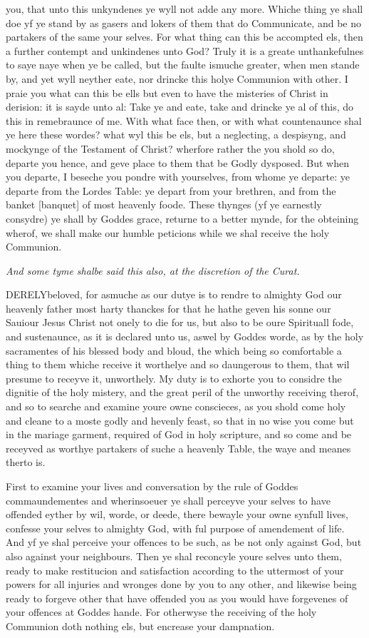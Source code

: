 you, that unto this unkyndenes ye wyll not adde any more. Whiche thing
ye shall doe yf ye stand by as gasers and lokers of them that do Communicate,
and be no partakers of the same your selves. For what thing can this be
accompted els, then a further contempt and unkindenes unto God? Truly
it is a greate unthankefulnes to saye naye when ye be called, but the
faulte ismuche greater, when men stande by, and yet wyll neyther eate,
nor drincke this holye Communion with other. I praie you what can this
be ells but even to have the misteries of Christ in derision: it is sayde
unto al: Take ye and eate, take and drincke ye al of this, do this in
remebraunce of me. With what face then, or with what countenaunce shal
ye here these wordes? what wyl this be els, but a neglecting, a despisyng,
and mockynge of the Testament of Christ? wherfore rather the you shold
so do, departe you hence, and geve place to them that be Godly dysposed.
But when you departe, I beseche you pondre with yourselves, from whome
ye departe: ye departe from the Lordes Table: ye depart from your brethren,
and from the banket [banquet]
of most heavenly foode. These thynges (yf ye earnestly consydre) ye shall
by Goddes grace, returne to a better mynde, for the obteining wherof,
we shall make our humble peticions while we shal receive the holy Communion.

\emph{And
some tyme shalbe said this also, at the discretion of the Curat.}

DERELY\textbf{}beloved, for asmuche as our dutye is to rendre to almighty God our
heavenly father most harty thanckes for that he hathe geven his sonne
our Sauiour Jesus Christ not onely to die for us, but also to be oure
Spirituall fode, and sustenaunce, as it is declared unto us, aswel by
Goddes worde, as by the holy sacramentes of his blessed body and bloud,
the which being so comfortable a thing to them whiche receive it worthelye
and so daungerous to them, that wil presume to receyve it, unworthely.
My duty is to exhorte you to considre the dignitie of the holy mistery,
and the great peril of the unworthy receiving therof, and so to searche
and examine youre owne conscieces, as you shold come holy and cleane to
a moste godly and hevenly feast, so that in no wise you come but in the
mariage garment, required of God in holy scripture, and so come and be
receyved as worthye partakers of suche a heavenly Table, the waye and
meanes therto is.

First to examine your lives and conversation by the
rule of Goddes commaundementes and wherinsoeuer ye shall perceyve your
selves to have offended eyther by wil, worde, or deede, there bewayle
your owne synfull lives, confesse your selves to almighty God, with ful
purpose of amendement of life. And yf ye shal perceive your offences to
be such, as be not only against God, but also against your neighbours.
Then ye shal reconcyle youre selves unto them, ready to make restitucion
and satisfaction according to the uttermost of your powers for all injuries
and wronges done by you to any other, and likewise being ready to forgeve
other that have offended you as you would have forgevenes of your offences
at Goddes hande. For otherwyse the receiving of the holy Communion doth
nothing els, but encrease your dampnation.

